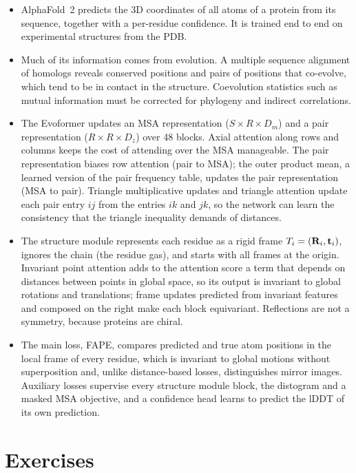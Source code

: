 \begin{itemize}
  \item AlphaFold~2 predicts the 3D coordinates of all atoms of a protein from its sequence, together with a per-residue confidence. It is trained end to end on experimental structures from the PDB.
  \item Much of its information comes from evolution. A multiple sequence alignment of homologs reveals conserved positions and pairs of positions that co-evolve, which tend to be in contact in the structure. Coevolution statistics such as mutual information must be corrected for phylogeny and indirect correlations.
  \item The Evoformer updates an MSA representation ($S\times R\times D_m$) and a pair representation ($R\times R\times D_z$) over 48 blocks. Axial attention along rows and columns keeps the cost of attending over the MSA manageable. The pair representation biases row attention (pair to MSA); the outer product mean, a learned version of the pair frequency table, updates the pair representation (MSA to pair). Triangle multiplicative updates and triangle attention update each pair entry $ij$ from the entries $ik$ and $jk$, so the network can learn the consistency that the triangle inequality demands of distances.
  \item The structure module represents each residue as a rigid frame $T_i=(\mathbf{R}_i,\mathbf{t}_i)$, ignores the chain (the residue gas), and starts with all frames at the origin. Invariant point attention adds to the attention score a term that depends on distances between points in global space, so its output is invariant to global rotations and translations; frame updates predicted from invariant features and composed on the right make each block equivariant. Reflections are not a symmetry, because proteins are chiral.
  \item The main loss, FAPE, compares predicted and true atom positions in the local frame of every residue, which is invariant to global motions without superposition and, unlike distance-based losses, distinguishes mirror images. Auxiliary losses supervise every structure module block, the distogram and a masked MSA objective, and a confidence head learns to predict the lDDT of its own prediction.
\end{itemize}

\section*{Exercises}

